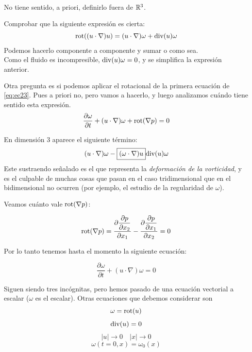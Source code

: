 \begin{observacion}
    No tiene sentido, a priori, definirlo fuera de $\mathbb{R}^3$.
\end{observacion}

\begin{ejercicio} %
    Comprobar que la siguiente expresión es cierta:
    $$\text{rot}((u \cdot \nabla)u) = (u \cdot \nabla) \omega + \text{div}(u) \omega$$
    Podemos hacerlo componente a componente y sumar o como sea. \\

    Como el fluido es incompresible, $\text{div}(u) \omega = 0$, y se simplifica la expresión anterior.
\end{ejercicio}

Otra pregunta es si podemos aplicar el rotacional de la primera ecuación de \eqref{eq:ec23}. Pues a priori no, pero vamos a hacerlo,
y luego analizamos cuándo tiene sentido esta expresión. \\

\begin{equation}
    \dfrac{\partial \omega}{\partial t} + (u \cdot \nabla) \omega + \text{rot}(\nabla p) = 0
\end{equation}

\begin{observacion}
    En dimensión 3 aparece el siguiente término:
    $$(u \cdot \nabla) \omega - \boxed{(\omega \cdot \nabla) u} \text{div}(u) \omega$$
    Este sustraendo señalado es el que representa la \textit{deformación de la vorticidad}, y es el culpable de muchas cosas que pasan
    en el caso tridimensional que en el bidimensional no ocurren (por ejemplo, el estudio de la regularidad de $\omega$).
\end{observacion}

Veamos cuánto vale $\text{rot}(\nabla p)$: 

$$\text{rot}(\nabla p) = \dfrac{\partial \dfrac{\partial p}{\partial x_2}}{\partial x_1} - \dfrac{\partial \dfrac{\partial p}{\partial x_1}}{\partial x_2} = 0$$

Por lo tanto tenemos hasta el momento la siguiente ecuación:

\begin{equation}\label{eq:ec25}
    \dfrac{\partial \omega}{\partial t} + (u \cdot \nabla) \omega = 0
\end{equation}

Siguen siendo tres incógnitas, pero hemos pasado de una ecuación vectorial a escalar ($\omega$ es el escalar). Otras ecuaciones que debemos considerar son
$$\omega = \text{rot}(u)$$
$$\text{div}(u) = 0$$
$$|u| \to 0 \quad |x| \to 0$$
$$\omega(t=0,x) = \omega_0(x)$$

